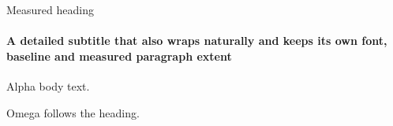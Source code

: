 \documentclass[11pt,aspectratio=169]{beamer}
\date{}
\begin{document}
\begin{frame}[t]{Measured heading}
\framesubtitle{A detailed subtitle that also wraps naturally and keeps its own font, baseline and measured paragraph extent}
Alpha body text.

Omega follows the heading.
\end{frame}
\end{document}
